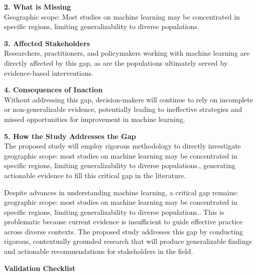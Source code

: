 \documentclass[11pt,a4paper]{article}
\begin{document}
\vspace{0.5em}

\textbf{2. What is Missing}\\
Geographic scope: Most studies on machine learning may be concentrated in specific regions, limiting generalizability to diverse populations.

\vspace{0.5em}

\textbf{3. Affected Stakeholders}\\
Researchers, practitioners, and policymakers working with machine learning are directly affected by this gap, as are the populations ultimately served by evidence-based interventions.

\vspace{0.5em}

\textbf{4. Consequences of Inaction}\\
Without addressing this gap, decision-makers will continue to rely on incomplete or non-generalizable evidence, potentially leading to ineffective strategies and missed opportunities for improvement in machine learning.

\vspace{0.5em}

\textbf{5. How the Study Addresses the Gap}\\
The proposed study will employ rigorous methodology to directly investigate geographic scope: most studies on machine learning may be concentrated in specific regions, limiting generalizability to diverse populations., generating actionable evidence to fill this critical gap in the literature.

\vspace{1em}

\begin{resultbox}
Despite advances in understanding machine learning, a critical gap remains: geographic scope: most studies on machine learning may be concentrated in specific regions, limiting generalizability to diverse populations.. This is problematic because current evidence is insufficient to guide effective practice across diverse contexts. The proposed study addresses this gap by conducting rigorous, contextually grounded research that will produce generalizable findings and actionable recommendations for stakeholders in the field.
\end{resultbox}

\vspace{1em}

\textbf{\large Validation Checklist}\par\vspace{0.3em}
\end{document}
